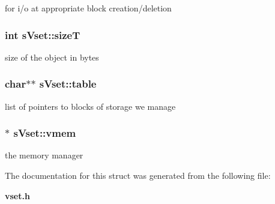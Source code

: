 for i/o at appropriate block creation/deletion 

\subsubsection[{size\-T}]{\setlength{\rightskip}{0pt plus 5cm}int s\-Vset\-::size\-T}\label{a00006_ab82de1c9f9c98179619094b92ffb4052}


size of the object in bytes 

\subsubsection[{table}]{\setlength{\rightskip}{0pt plus 5cm}char$\ast$$\ast$ s\-Vset\-::table}\label{a00006_a644cf781925192d072fa752cf2d08e13}


list of pointers to blocks of storage we manage 

\subsubsection[{vmem}]{$\ast$ s\-Vset\-::vmem}\label{a00006_a8af7fe493b077ad70164626b317e5d39}


the memory manager 



The documentation for this struct was generated from the following file\-:\begin{DoxyCompactItemize}
\item 
{\bf vset.\-h}\end{DoxyCompactItemize}

